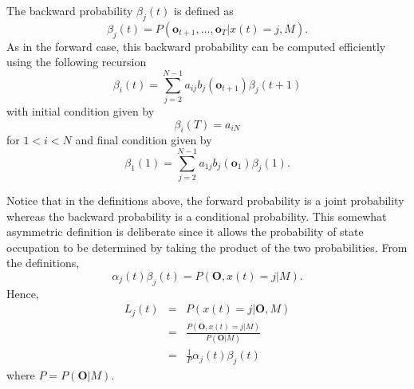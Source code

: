 The backward probability $\beta_j(t)$ is defined as 
\begin{equation} \label{e:21}
   \beta_j(t) = P(\bm{o}_{t+1},\ldots,\bm{o}_T | x(t)=j , M).
\end{equation}
As in the forward case, this backward probability can be 
computed efficiently using the following recursion
\begin{equation}
   \beta_i(t) = \sum_{j=2}^{N-1} a_{ij} b_j(\bm{o}_{t+1}) \beta_j(t+1)
\end{equation}
with initial condition given by
\begin{equation}
   \beta_i(T) = a_{iN}
\end{equation}
for $1<i<N$ and final condition given by
\begin{equation}
   \beta_1(1) = \sum_{j=2}^{N-1} a_{1j} b_j(\bm{o}_1) \beta_j(1).
\end{equation}

Notice that in the definitions above, the forward
probability is a joint probability whereas the backward
probability is a conditional probability.  This somewhat
asymmetric definition is deliberate since it allows the
probability of state occupation to be determined by taking the
product of the two probabilities.  From the definitions,
\begin{equation} \label{e:25}
 \alpha_j(t) \beta_j(t) = P(\bm{O},x(t)=j | M).
\end{equation}
Hence, 
\begin{eqnarray}
  L_j(t) & = & P(x(t)=j|\bm{O},M) \\ \nonumber
         & = & \frac{P(\bm{O},x(t)=j | M)}{P(\bm{O}|M)} \\ \nonumber
                & = & \frac{1}{P} \alpha_j(t) \beta_j(t)
\end{eqnarray}
where $P=P(\bm{O}|M)$.

